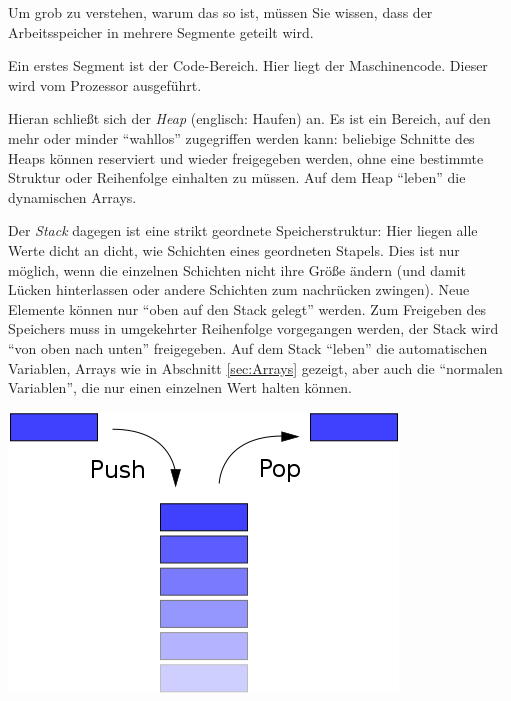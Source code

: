 Um grob zu verstehen, warum das so ist, müssen Sie wissen, dass der Arbeitsspeicher in mehrere Segmente geteilt wird.

Ein erstes Segment ist der Code-Bereich. Hier liegt der Maschinencode. Dieser wird vom Prozessor ausgeführt.

Hieran schließt sich der \emph{Heap} (englisch: Haufen) an. Es ist ein Bereich, auf den mehr oder minder \enquote{wahllos} zugegriffen werden kann: beliebige Schnitte des Heaps können reserviert und wieder freigegeben werden, ohne eine bestimmte Struktur oder Reihenfolge einhalten zu müssen. Auf dem Heap \enquote{leben} die dynamischen Arrays.

Der \emph{Stack} dagegen ist eine strikt geordnete Speicherstruktur: Hier liegen alle Werte dicht an dicht, wie Schichten eines geordneten Stapels. Dies ist nur möglich, wenn die einzelnen Schichten nicht ihre Größe ändern (und damit Lücken hinterlassen oder andere Schichten zum nachrücken zwingen). Neue Elemente können nur \enquote{oben auf den Stack gelegt} werden. Zum Freigeben des Speichers muss in umgekehrter Reihenfolge vorgegangen werden, der Stack wird \enquote{von oben nach unten} freigegeben. Auf dem Stack \enquote{leben} die automatischen Variablen, \ie Arrays wie in Abschnitt \ref{sec:Arrays} gezeigt, aber auch die \enquote{normalen Variablen}, die nur einen einzelnen Wert halten können.

\begin{tcolorbox}[title=Visualisierung: Heap und Stack]
\hspace{10pt}
\includegraphics[width=.2\linewidth]{./gfx/Stack}
\end{tcolorbox}

